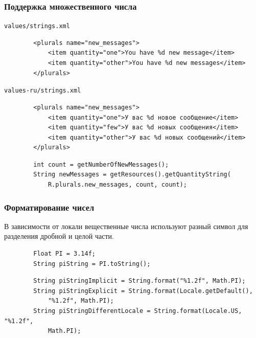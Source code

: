 \documentclass{beamer}
\begin{document}
\begin{frame}[fragile]
    \frametitle{Поддержка множественного числа}
    \texttt{\footnotesize values/strings.xml}
    \begin{verbatim}
        <plurals name="new_messages">
            <item quantity="one">You have %d new message</item>
            <item quantity="other">You have %d new messages</item>
        </plurals>
    \end{verbatim}
    \texttt{\footnotesize values-ru/strings.xml}
    \begin{verbatim}
        <plurals name="new_messages">
            <item quantity="one">У вас %d новое сообщение</item>
            <item quantity="few">У вас %d новых сообщения</item>
            <item quantity="other">У вас %d новых сообщений</item>
        </plurals>
    \end{verbatim}
    \begin{verbatim}
        int count = getNumberOfNewMessages();
        String newMessages = getResources().getQuantityString(
            R.plurals.new_messages, count, count);
    \end{verbatim}
\end{frame}

\begin{frame}[fragile]
    \frametitle{Форматирование чисел}
    В зависимости от локали вещественные числа используют разный символ для
    разделения дробной и целой части.
    \begin{verbatim}
        Float PI = 3.14f;
        String piString = PI.toString();
    \end{verbatim}
    \begin{verbatim}
        String piStringImplicit = String.format("%1.2f", Math.PI);
        String piStringExplicit = String.format(Locale.getDefault(),
            "%1.2f", Math.PI);
        String piStringDifferentLocale = String.format(Locale.US, "%1.2f",
            Math.PI);
    \end{verbatim}
\end{frame}
\end{document}
